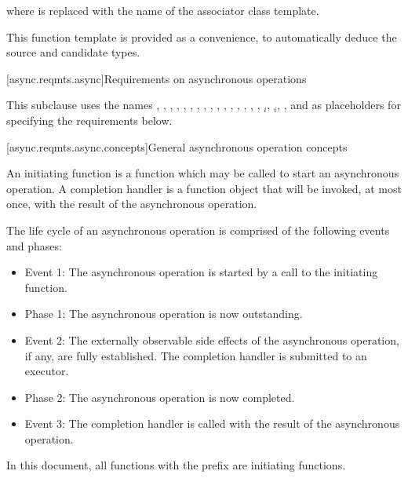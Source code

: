 where  is replaced with the name of the associator class template.
\begin{note} This function template is provided as a convenience, to automatically deduce the source and candidate types. \end{note}



[async.reqmts.async]{Requirements on asynchronous operations}

\pnum
This subclause uses the names , , , , , , , , , , , , , , , , $_i$, $_i$, , and  as placeholders for specifying the requirements below.


[async.reqmts.async.concepts]{General asynchronous operation concepts}

\pnum
An initiating function is a function which may be called to start an asynchronous operation. A completion handler is a function object that will be invoked, at most once, with the result of the asynchronous operation.

\pnum
 The life cycle of an asynchronous operation is comprised of the following events and phases:

\begin{itemize}
\item
Event 1: The asynchronous operation is started by a call to the initiating function.

\item
Phase 1: The asynchronous operation is now outstanding.

\item
Event 2: The externally observable side effects of the asynchronous operation, if any, are fully established. The completion handler is submitted to an executor.

\item
Phase 2: The asynchronous operation is now completed.

\item
Event 3: The completion handler is called with the result of the asynchronous operation.
\end{itemize}

\pnum
In this document, all functions with the prefix  are initiating functions.



